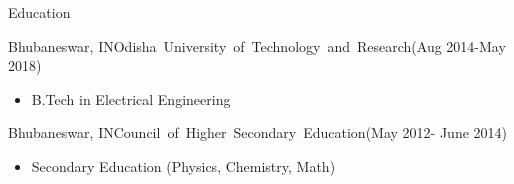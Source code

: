 \documentclass[]{mcdowellcv}
\begin{document}
    \begin{cvsection}{Education}
        \begin{cvsubsection}{Bhubaneswar, IN}{\mbox{Odisha University of Technology and Research}}{(Aug 2014-May 2018)}
            \begin{itemize}
                \item B.Tech in  Electrical Engineering
            \end{itemize}
        \end{cvsubsection}
        \begin{cvsubsection}{Bhubaneswar, IN}{\mbox{Council of Higher Secondary Education}}{(May 2012- June 2014)}
            \begin{itemize}
                \item Secondary Education (Physics, Chemistry, Math)
            \end{itemize}
        \end{cvsubsection}
    \end{cvsection}
\end{document}
